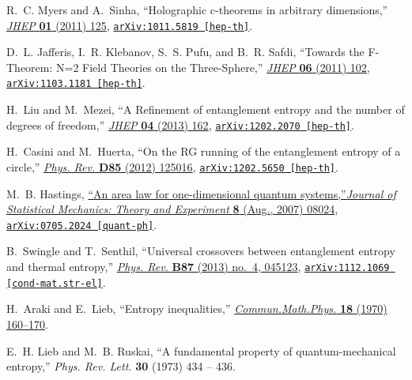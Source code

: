 \begin{thebibliography}{100}
R.~C. Myers and A.~Sinha, ``{Holographic c-theorems in arbitrary dimensions},''
  \href{http://dx.doi.org/10.1007/JHEP01(2011)125}{{\em JHEP} {\bf 01} (2011)
  125},
\href{http://arxiv.org/abs/1011.5819}{{\tt arXiv:1011.5819 [hep-th]}}.

D.~L. Jafferis, I.~R. Klebanov, S.~S. Pufu, and B.~R. Safdi, ``{Towards the
  F-Theorem: N=2 Field Theories on the Three-Sphere},''
  \href{http://dx.doi.org/10.1007/JHEP06(2011)102}{{\em JHEP} {\bf 06} (2011)
  102},
\href{http://arxiv.org/abs/1103.1181}{{\tt arXiv:1103.1181 [hep-th]}}.

H.~Liu and M.~Mezei, ``{A Refinement of entanglement entropy and the number of
  degrees of freedom},'' \href{http://dx.doi.org/10.1007/JHEP04(2013)162}{{\em
  JHEP} {\bf 04} (2013)  162},
\href{http://arxiv.org/abs/1202.2070}{{\tt arXiv:1202.2070 [hep-th]}}.

H.~Casini and M.~Huerta, ``{On the RG running of the entanglement entropy of a
  circle},'' \href{http://dx.doi.org/10.1103/PhysRevD.85.125016}{{\em Phys.
  Rev.} {\bf D85} (2012)  125016},
\href{http://arxiv.org/abs/1202.5650}{{\tt arXiv:1202.5650 [hep-th]}}.

M.~B. {Hastings},
  \href{http://dx.doi.org/10.1088/1742-5468/2007/08/P08024}{``{An area law for
  one-dimensional quantum systems},''{\em Journal of Statistical Mechanics:
  Theory and Experiment} {\bf 8} (Aug., 2007)  08024},
  \href{http://arxiv.org/abs/0705.2024}{{\tt arXiv:0705.2024 [quant-ph]}}.

B.~Swingle and T.~Senthil, ``{Universal crossovers between entanglement entropy
  and thermal entropy},''
  \href{http://dx.doi.org/10.1103/PhysRevB.87.045123}{{\em Phys. Rev.} {\bf
  B87} (2013) no.~4, 045123},
\href{http://arxiv.org/abs/1112.1069}{{\tt arXiv:1112.1069 [cond-mat.str-el]}}.

H.~Araki and E.~Lieb, ``{Entropy inequalities},''
\href{http://dx.doi.org/10.1007/BF01646092}{{\em Commun.Math.Phys.} {\bf 18}
  (1970)  160--170}.

E.~H. Lieb and M.~B. Ruskai, ``A fundamental property of quantum-mechanical
  entropy,'' {\em Phys. Rev. Lett.} {\bf 30} (1973)  434 -- 436.


\end{thebibliography}
